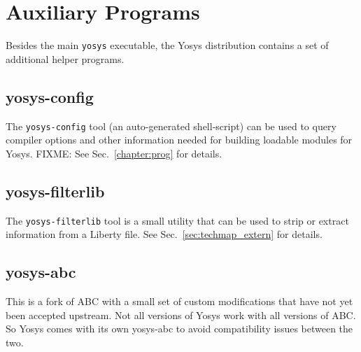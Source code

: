 
\chapter{Auxiliary Programs}

Besides the main {\tt yosys} executable, the Yosys distribution contains a set
of additional helper programs.

\section{yosys-config}

The {\tt yosys-config} tool (an auto-generated shell-script) can be used to
query compiler options and other information needed for building loadable
modules for Yosys. FIXME: See Sec.~\ref{chapter:prog} for details.

\section{yosys-filterlib}
\label{sec:filterlib}

The {\tt yosys-filterlib} tool is a small utility that can be used to strip
or extract information from a Liberty file. See Sec.~\ref{sec:techmap_extern}
for details.

\section{yosys-abc}

This is a fork of ABC  with a small set of custom modifications
that have not yet been accepted upstream. Not all versions of Yosys work with
all versions of ABC. So Yosys comes with its own yosys-abc to avoid
compatibility issues between the two.

